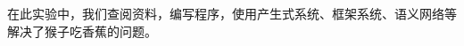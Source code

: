 

\begin{cnabstract}
  在此实验中，我们查阅资料\cite{AI}，编写程序，使用产生式系统、框架系统、语义网络等解决了猴子吃香蕉的问题。
\end{cnabstract}
\par
\vspace*{2em}


